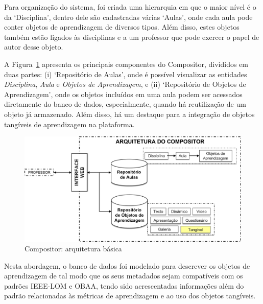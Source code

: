 Para organização do sistema, foi criada uma hierarquia em que o maior nível é o da `Disciplina', dentro dele são cadastradas várias `Aulas', onde cada aula pode conter objetos de aprendizagem de diversos tipos. Além disso, estes objetos também estão ligados às disciplinas e a um professor que pode exercer o papel de autor desse objeto.



A Figura~\ref{fig:arquitetura_compositor} apresenta os principais componentes do Compositor, divididos em duas partes: (i) `Repositório de Aulas', onde é possível visualizar as entidades \textit{Disciplina}, \textit{Aula} e \textit{Objetos de Aprendizagem}, e (ii) `Repositório de Objetos de Aprendizagem', onde os objetos incluídos em uma aula podem ser acessados diretamente do banco de dados, especialmente, quando há reutilização de um objeto já armazenado. Além disso, há um destaque para a integração de objetos tangíveis de aprendizagem na plataforma.

\begin{figure}[htb]
	\centering
	\includegraphics[width=0.9\linewidth]{chapters/proposedMethod/arquitetura_compositor.png}
	\caption{Compositor: arquitetura básica}
	\label{fig:arquitetura_compositor}
\end{figure}

Nesta abordagem, o banco de dados foi modelado para descrever os objetos de aprendizagem de tal modo que os seus metadados sejam compatíveis com os padrões IEEE-LOM e OBAA, tendo sido acrescentadas informações além do padrão relacionadas às métricas de aprendizagem e ao uso dos objetos tangíveis.

